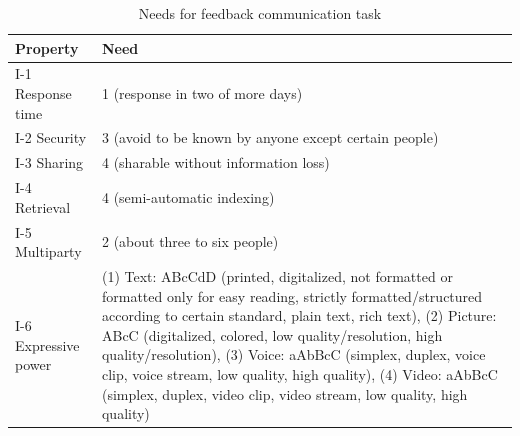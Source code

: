 \documentclass[english,12pt,a4paper,pdftex]{article}
\begin{document}
\begin{table}[!h]
\renewcommand{\arraystretch}{1.3}
\caption{Needs for feedback communication task}
\label{table:needs_for_feedback_communication_task}
\centering
\begin{tabular}{|p{7cm}|p{7cm}|}
\hline
\textbf{Property} & \textbf{Need}\\
\hline
I-1 Response time & 1 (response in two of more days) \\
\hline
I-2 Security & 3 (avoid to be known by anyone except certain people) \\
\hline
I-3 Sharing & 4 (sharable without information loss) \\
\hline
I-4 Retrieval & 4 (semi-automatic indexing) \\
\hline
I-5 Multiparty & 2 (about three to six people) \\
\hline
I-6 Expressive power & (1) Text: ABcCdD (printed, digitalized, not formatted or formatted only for easy reading, strictly formatted/structured according to certain standard, plain text, rich text), (2) Picture: ABcC (digitalized, colored, low quality/resolution, high quality/resolution), (3) Voice: aAbBcC (simplex, duplex, voice clip, voice stream, low quality, high quality), (4) Video: aAbBcC (simplex, duplex, video clip, video stream, low quality, high quality) \\
\hline
\end{tabular}
\end{table}
\end{document}
